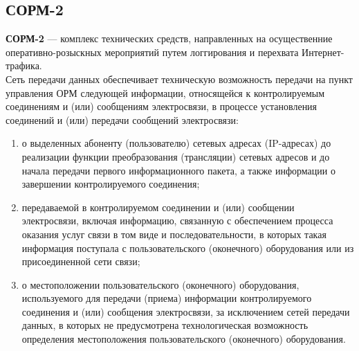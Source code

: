 {\subsection{СОРМ-2}
\textbf{СОРМ-2} --- комплекс технических средств, направленных на осущественние оперативно-розыскных мероприятий путем логгирования и перехвата Интернет-трафика.\\
Сеть передачи данных обеспечивает техническую возможность передачи на пункт управления ОРМ следующей информации, относящейся к контролируемым соединениям и (или) сообщениям электросвязи, в процессе установления соединений и (или) передачи сообщений электросвязи\cite{sorm_sorm2}:
\begin{enumerate}
\item о выделенных абоненту (пользователю) сетевых адресах (IP-адресах) до реализации функции преобразования (трансляции) сетевых адресов и до начала передачи первого информационного пакета, а также информации о завершении контролируемого соединения;
\item передаваемой в контролируемом соединении и (или) сообщении электросвязи, включая информацию, связанную с обеспечением процесса оказания услуг связи в том виде и последовательности, в которых такая информация поступала с пользовательского (оконечного) оборудования или из присоединенной сети связи;
\item о местоположении пользовательского (оконечного) оборудования, используемого для передачи (приема) информации контролируемого соединения и (или) сообщения электросвязи, за исключением сетей передачи данных, в которых не предусмотрена технологическая возможность определения местоположения пользовательского (оконечного) оборудования.\end{enumerate}
}
